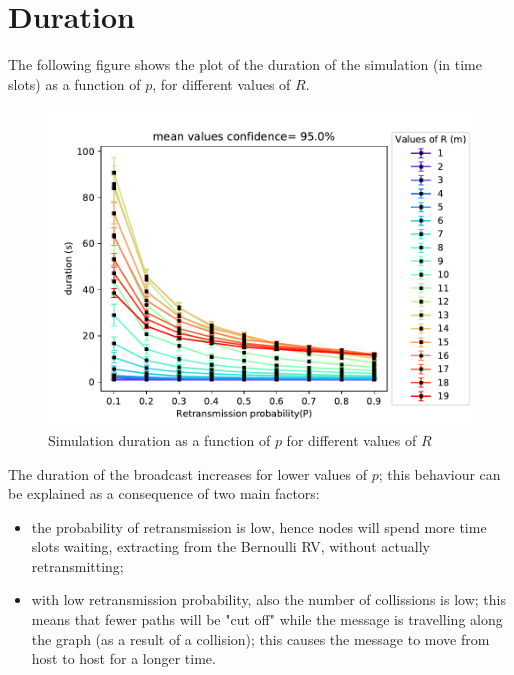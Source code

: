 \section{Duration}\label{sec:duration}
The following figure shows the plot of the duration of the simulation (in time
slots) as a function of $p$, for different values of $R$.
\begin{figure}[H]
    \begin{center}
        \includegraphics[scale=.67,trim={0 0 0 0.8cm},clip]{img/big_duration (s)_p_mean_95.0.pdf}
    \end{center}
    \vspace*{-0.5cm}
    \caption{Simulation duration as a function of $p$ for different values of $R$}
    \label{fig:durationPR}
\end{figure}
\noindent
The duration of the broadcast increases for lower values of $p$; this behaviour can be
explained as a consequence of two main factors:
\begin{itemize}
    \item the probability of retransmission is low, hence nodes will spend more
    time slots waiting, extracting from the Bernoulli RV, without actually
	retransmitting;
    \item with low retransmission probability, also the number of collissions
	is low; this means that fewer paths will be "cut off" while the message is
	travelling along the graph (as a result of a collision); this causes the
	message to move from host to host for a longer time.
\end{itemize}
